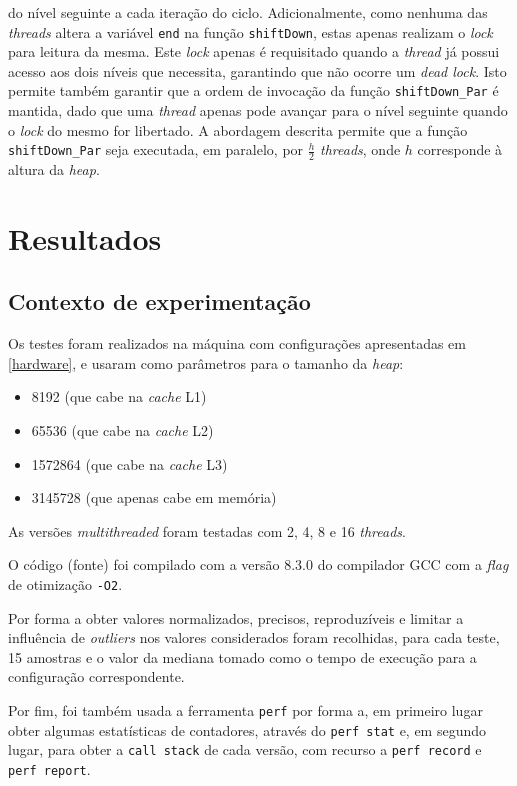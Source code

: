 \documentclass{article}
\begin{document}
do nível seguinte a cada iteração do ciclo. Adicionalmente, como nenhuma das \textit{threads} altera a variável \texttt{end} na função 
\texttt{shiftDown}, estas apenas realizam o \textit{lock} para leitura da mesma. Este \textit{lock} apenas é requisitado quando a \textit{thread} já 
possui acesso aos dois níveis que necessita, garantindo que não ocorre um \textit{dead lock}. Isto permite também garantir que a ordem de 
invocação da função \texttt{shiftDown\_Par} é mantida, dado que uma \textit{thread} apenas pode avançar para o nível seguinte quando o 
\textit{lock} do mesmo for libertado. A abordagem descrita permite que a função \texttt{shiftDown\_Par} seja executada, em paralelo, por 
$\frac{h}{2}$ \textit{threads}, onde $h$ corresponde à altura da \textit{heap}.

\section{Resultados}

\subsection{Contexto de experimentação} \label{context}
Os testes foram realizados na máquina com configurações apresentadas em \ref{hardware}, e usaram como parâmetros para o tamanho da \textit{heap}:
\begin{itemize}
    \item 8192 (que cabe na \textit{cache} L1) 
    \item 65536  (que cabe na \textit{cache} L2) 
    \item 1572864 (que cabe na \textit{cache} L3) 
    \item 3145728 (que apenas cabe em memória) 
\end{itemize}
As versões \textit{multithreaded} foram testadas com 2, 4, 8 e 16 \textit{threads}.

O código (fonte) foi compilado com a versão 8.3.0 do compilador GCC com a \textit{flag} de otimização \texttt{-O2}.

Por forma a obter valores normalizados, precisos, reproduzíveis e limitar a influência de \textit{outliers} nos valores considerados foram
recolhidas, para cada teste, 15 amostras e o valor da mediana tomado como o tempo de execução para a configuração 
correspondente.

Por fim, foi também usada a ferramenta \texttt{perf} por forma a, em primeiro lugar obter algumas estatísticas de contadores, através do \texttt{perf stat} e, em segundo lugar, para obter a \texttt{call stack} de cada versão, com recurso a \texttt{perf record} e \texttt{perf report}.
\end{document}
